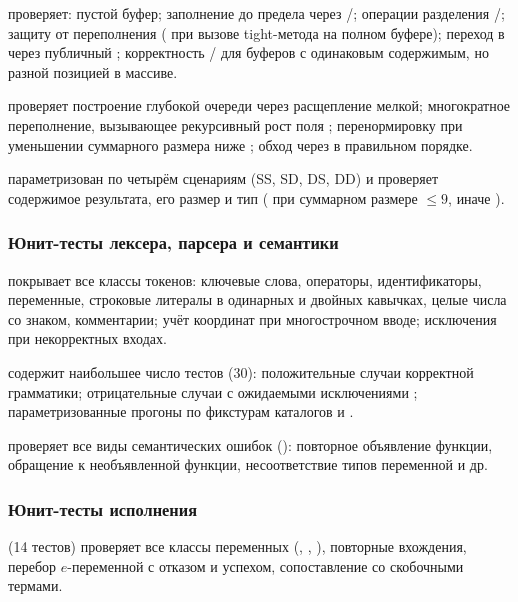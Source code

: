  проверяет: пустой буфер; заполнение до предела через
/; операции разделения
/; защиту от переполнения
( при вызове tight-метода на полном буфере);
переход в  через публичный ;
корректность / для буферов с одинаковым
содержимым, но разной позицией  в массиве.

 проверяет построение глубокой очереди через расщепление
мелкой; многократное переполнение, вызывающее рекурсивный рост поля
; перенормировку  при уменьшении суммарного размера
ниже ; обход через  в правильном порядке.

 параметризован по четырём сценариям 
(SS, SD, DS, DD) и проверяет содержимое результата, его размер и тип
( при суммарном размере $\le 9$, иначе ).

\subsubsection{Юнит-тесты лексера, парсера и семантики}

 покрывает все классы токенов: ключевые слова, операторы,
идентификаторы, переменные, строковые литералы в одинарных и двойных
кавычках, целые числа со знаком, комментарии; учёт координат при
многострочном вводе; исключения  при некорректных входах.

 содержит наибольшее число тестов (30): положительные
случаи корректной грамматики; отрицательные случаи с ожидаемыми
исключениями ; параметризованные прогоны по фикстурам
каталогов  и .

 проверяет все виды семантических ошибок
(): повторное объявление функции,
обращение к необъявленной функции, несоответствие типов переменной и др.

\subsubsection{Юнит-тесты исполнения}

 (14 тестов) проверяет все классы переменных (,
, ), повторные вхождения, перебор \(e\)-переменной с
отказом и успехом, сопоставление со скобочными термами.

